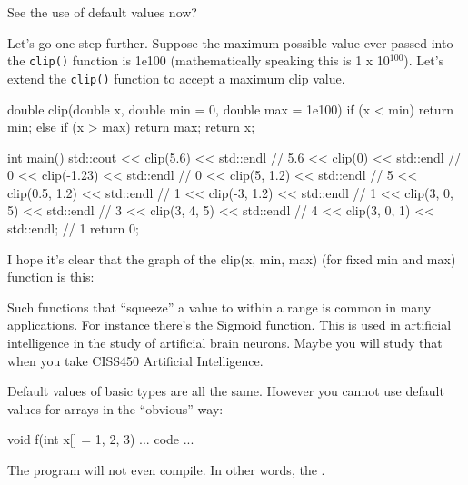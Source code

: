 See the use of default values now?

Let's go one step further. Suppose the maximum possible value ever passed into the \texttt{clip()} function is 1e100 (mathematically speaking this is 1 x 10$^{100}$). Let's extend the \texttt{clip()} function to accept a maximum clip value.

\begin{consolethree}[escapeinside=||]
double clip(double x,
            double min = 0, double max = 1e100)
{
    if (x < min)
        return min;
    else if (x > max)
        return max;
    return x;
}

int main()
{
    std::cout << clip(5.6) << std::endl      // 5.6
              << clip(0) << std::endl        // 0
              << clip(-1.23) << std::endl    // 0
              << clip(5, 1.2) << std::endl   // 5
              << clip(0.5, 1.2) << std::endl // 1
              << clip(-3, 1.2) << std::endl  // 1
              << clip(3, 0, 5) << std::endl  // 3
              << clip(3, 4, 5) << std::endl  // 4
              << clip(3, 0, 1) << std::endl; // 1
    return 0;
}
\end{consolethree}

I hope it's clear that the graph of the clip(x, min, max) (for fixed min and max) function is this:


Such functions that ``squeeze'' a value to within a range is common in many applications. For instance there's the Sigmoid function. This is used in artificial intelligence in the study of artificial brain neurons. Maybe you will study that when you take CISS450 Artificial Intelligence.



Default values of basic types are all the same. However you cannot use default values for arrays in the ``obvious'' way:

\begin{consolethree}[escapeinside=||]
void f(int x[] = {1, 2, 3})
{
    ... code ...
}
\end{consolethree}

The program will not even compile. In other words, the .


